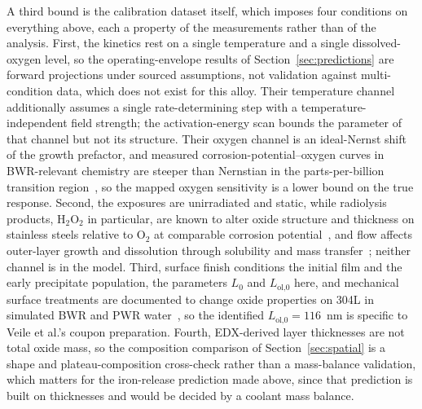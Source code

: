 \documentclass[pdflatex,sn-nature]{sn-jnl}
\begin{document}
A third bound is the calibration dataset itself, which imposes four
conditions on everything above, each a property of the measurements
rather than of the analysis. First, the kinetics
rest on a single temperature and a single dissolved-oxygen level, so the
operating-envelope results of Section~\ref{sec:predictions} are forward
projections under sourced assumptions, not validation against
multi-condition data, which does not exist for this alloy. Their
temperature channel additionally assumes a single rate-determining step
with a temperature-independent field strength; the activation-energy
scan bounds the parameter of that channel but not its structure. Their
oxygen channel is an ideal-Nernst shift of the growth prefactor, and
measured corrosion-potential--oxygen curves in BWR-relevant chemistry
are steeper than Nernstian in the parts-per-billion transition
region~\citep{lin1996ecp}, so the mapped oxygen sensitivity is a lower
bound on the true response. Second, the exposures are unirradiated and
static, while radiolysis products, H$_2$O$_2$ in particular, are known
to alter oxide structure and thickness on stainless steels relative to
O$_2$ at comparable corrosion potential~\citep{kim1999oxide}, and flow
affects outer-layer growth and dissolution through solubility and mass
transfer~\citep{lister1987release}; neither channel is in the model.
Third, surface finish conditions the initial film and the early
precipitate population, the parameters $L_0$ and $L_\text{ol,0}$ here,
and mechanical surface treatments are documented to change oxide
properties on 304L in simulated BWR and PWR
water~\citep{surface_treatment_304l}, so the identified $L_\text{ol,0} =
116$~nm is specific to Veile et al.'s coupon preparation. Fourth,
EDX-derived layer thicknesses are not total oxide mass, so the
composition comparison of Section~\ref{sec:spatial} is a shape and
plateau-composition cross-check rather than a mass-balance validation,
which matters for the iron-release prediction made above,
since that prediction is built on
thicknesses and would be decided by a coolant mass balance.
\end{document}
